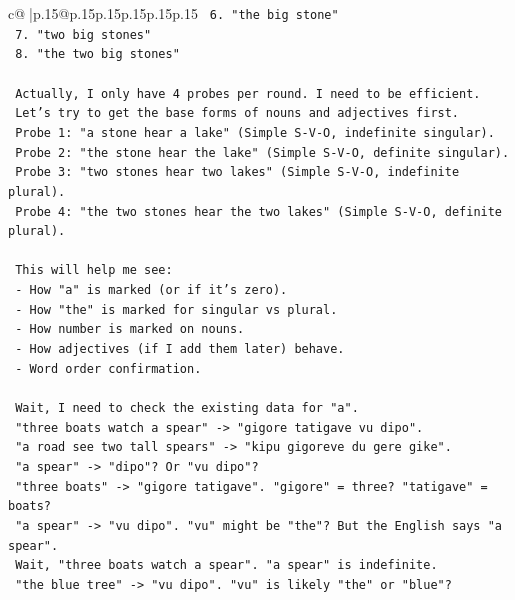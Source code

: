 \documentclass{article}
\begin{document}
{\begin{supertabular}{c@{$\;$}|p{.15\linewidth}@{}p{.15\linewidth}p{.15\linewidth}p{.15\linewidth}p{.15\linewidth}p{.15\linewidth}}
{{{\texttt{    6.  "the big stone"} \\
\texttt{    7.  "two big stones"} \\
\texttt{    8.  "the two big stones"} \\
\\ 
\texttt{    Actually, I only have 4 probes per round. I need to be efficient.} \\
\texttt{    Let's try to get the base forms of nouns and adjectives first.} \\
\texttt{    Probe 1: "a stone hear a lake" (Simple S{-}V{-}O, indefinite singular).} \\
\texttt{    Probe 2: "the stone hear the lake" (Simple S{-}V{-}O, definite singular).} \\
\texttt{    Probe 3: "two stones hear two lakes" (Simple S{-}V{-}O, indefinite plural).} \\
\texttt{    Probe 4: "the two stones hear the two lakes" (Simple S{-}V{-}O, definite plural).} \\
\\ 
\texttt{    This will help me see:} \\
\texttt{    {-} How "a" is marked (or if it's zero).} \\
\texttt{    {-} How "the" is marked for singular vs plural.} \\
\texttt{    {-} How number is marked on nouns.} \\
\texttt{    {-} How adjectives (if I add them later) behave.} \\
\texttt{    {-} Word order confirmation.} \\
\\ 
\texttt{    Wait, I need to check the existing data for "a".} \\
\texttt{    "three boats watch a spear" {-}> "gigore tatigave vu dipo".} \\
\texttt{    "a road see two tall spears" {-}> "kipu gigoreve du gere gike".} \\
\texttt{    "a spear" {-}> "dipo"? Or "vu dipo"?} \\
\texttt{    "three boats" {-}> "gigore tatigave". "gigore" = three? "tatigave" = boats?} \\
\texttt{    "a spear" {-}> "vu dipo". "vu" might be "the"? But the English says "a spear".} \\
\texttt{    Wait, "three boats watch a spear". "a spear" is indefinite.} \\
\texttt{    "the blue tree" {-}> "vu dipo". "vu" is likely "the" or "blue"?} \\
}}}
\end{supertabular}}
\end{document}
